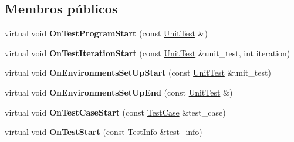 \subsection*{Membros públicos}
\begin{DoxyCompactItemize}
\item 
\hypertarget{classtesting_1_1internal_1_1PrettyUnitTestResultPrinter_a7a6b6de195b4ef3c9f2edd2e6c270f3e}{virtual void {\bfseries On\-Test\-Program\-Start} (const \hyperlink{classtesting_1_1UnitTest}{Unit\-Test} \&)}\label{classtesting_1_1internal_1_1PrettyUnitTestResultPrinter_a7a6b6de195b4ef3c9f2edd2e6c270f3e}

\item 
\hypertarget{classtesting_1_1internal_1_1PrettyUnitTestResultPrinter_abdba10a8c97e272ab4cee97cb652c957}{virtual void {\bfseries On\-Test\-Iteration\-Start} (const \hyperlink{classtesting_1_1UnitTest}{Unit\-Test} \&unit\-\_\-test, int iteration)}\label{classtesting_1_1internal_1_1PrettyUnitTestResultPrinter_abdba10a8c97e272ab4cee97cb652c957}

\item 
\hypertarget{classtesting_1_1internal_1_1PrettyUnitTestResultPrinter_a846a5e82b421e04fcdd2b1b2b64b162f}{virtual void {\bfseries On\-Environments\-Set\-Up\-Start} (const \hyperlink{classtesting_1_1UnitTest}{Unit\-Test} \&unit\-\_\-test)}\label{classtesting_1_1internal_1_1PrettyUnitTestResultPrinter_a846a5e82b421e04fcdd2b1b2b64b162f}

\item 
\hypertarget{classtesting_1_1internal_1_1PrettyUnitTestResultPrinter_aadba892f02606a8b0c5f5982b3553aac}{virtual void {\bfseries On\-Environments\-Set\-Up\-End} (const \hyperlink{classtesting_1_1UnitTest}{Unit\-Test} \&)}\label{classtesting_1_1internal_1_1PrettyUnitTestResultPrinter_aadba892f02606a8b0c5f5982b3553aac}

\item 
\hypertarget{classtesting_1_1internal_1_1PrettyUnitTestResultPrinter_adcb68c729565d4bcdf8418a52902c3de}{virtual void {\bfseries On\-Test\-Case\-Start} (const \hyperlink{classtesting_1_1TestCase}{Test\-Case} \&test\-\_\-case)}\label{classtesting_1_1internal_1_1PrettyUnitTestResultPrinter_adcb68c729565d4bcdf8418a52902c3de}

\item 
\hypertarget{classtesting_1_1internal_1_1PrettyUnitTestResultPrinter_a5078ee71cfa97e37ae7a9366149195c5}{virtual void {\bfseries On\-Test\-Start} (const \hyperlink{classtesting_1_1TestInfo}{Test\-Info} \&test\-\_\-info)}\label{classtesting_1_1internal_1_1PrettyUnitTestResultPrinter_a5078ee71cfa97e37ae7a9366149195c5}


\end{DoxyCompactItemize}
